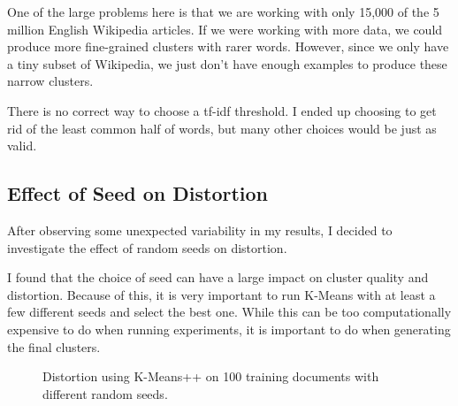 \documentclass{article} %
\begin{document}
One of the large problems here is that we are working with only 15,000 of the 5 million English Wikipedia articles. If we were working with more data, we could produce more fine-grained clusters with rarer words. However, since we only have a tiny subset of Wikipedia, we just don't have enough examples to produce these narrow clusters.

There is no correct way to choose a tf-idf threshold. I ended up choosing to get rid of the least common half of words, but many other choices would be just as valid.




\subsection{Effect of Seed on Distortion}

After observing some unexpected variability in my results, I decided to investigate the effect of random seeds on distortion.

I found that the choice of seed can have a large impact on cluster quality and distortion. Because of this, it is very important to run K-Means with at least a few different seeds and select the best one. While this can be too computationally expensive to do when running experiments, it is important to do when generating the final clusters.

\begin{figure}[h]
\begin{center}
\end{center}
\caption{Distortion using K-Means++ on 100 training documents with different random seeds.}
\end{figure}
\end{document}
